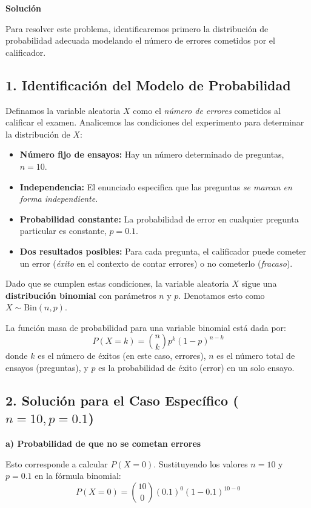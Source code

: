 \documentclass[a4paper]{article}
\begin{document}
\vspace{0.5cm}

\textbf{Solución}

Para resolver este problema, identificaremos primero la distribución de probabilidad adecuada modelando el número de errores cometidos por el calificador.

\subsection*{1. Identificación del Modelo de Probabilidad}

Definamos la variable aleatoria $X$ como el \textit{número de errores} cometidos al calificar el examen. Analicemos las condiciones del experimento para determinar la distribución de $X$:

\begin{itemize}
    \item \textbf{Número fijo de ensayos:} Hay un número determinado de preguntas, $n = 10$.
    \item \textbf{Independencia:} El enunciado especifica que las preguntas \textit{se marcan en forma independiente}.
    \item \textbf{Probabilidad constante:} La probabilidad de error en cualquier pregunta particular es constante, $p = 0.1$.
    \item \textbf{Dos resultados posibles:} Para cada pregunta, el calificador puede cometer un error (\textit{éxito} en el contexto de contar errores) o no cometerlo (\textit{fracaso}).
\end{itemize}

Dado que se cumplen estas condiciones, la variable aleatoria $X$ sigue una \textbf{distribución binomial} con parámetros $n$ y $p$. Denotamos esto como $X \sim \text{Bin}(n, p)$.

La función masa de probabilidad para una variable binomial está dada por:
$$ P(X = k) = \binom{n}{k} p^k (1-p)^{n-k} $$
donde $k$ es el número de éxitos (en este caso, errores), $n$ es el número total de ensayos (preguntas), y $p$ es la probabilidad de éxito (error) en un solo ensayo.

\subsection*{2. Solución para el Caso Específico ($n=10, p=0.1$)}

\textbf{a) Probabilidad de que no se cometan errores}

Esto corresponde a calcular $P(X = 0)$. Sustituyendo los valores $n=10$ y $p=0.1$ en la fórmula binomial:
$$ P(X = 0) = \binom{10}{0} (0.1)^0 (1 - 0.1)^{10-0} $$
\end{document}
